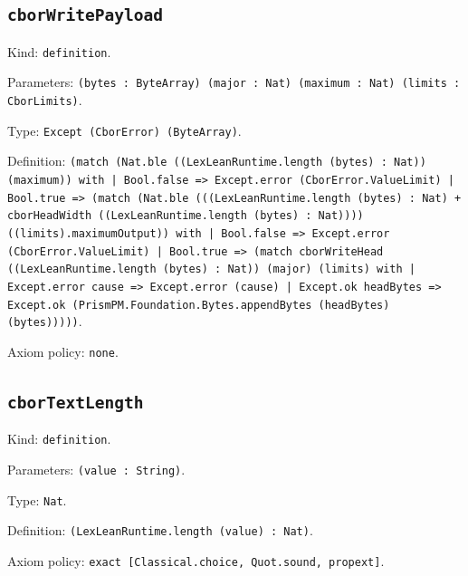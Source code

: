 \documentclass[11pt]{article}
\begin{document}
\subsection*{\texttt{cborWritePayload}}
\noindent Kind: \texttt{definition}.\par
\noindent Parameters: \texttt{(bytes : ByteArray) (major : Nat) (maximum : Nat) (limits : CborLimits)}.\par
\noindent Type: \texttt{Except (CborError) (ByteArray)}.\par
\noindent Definition: \texttt{(match (Nat.ble ((LexLeanRuntime.length (bytes) : Nat)) (maximum)) with | Bool.false => Except.error (CborError.ValueLimit) | Bool.true => (match (Nat.ble (((LexLeanRuntime.length (bytes) : Nat) + cborHeadWidth ((LexLeanRuntime.length (bytes) : Nat)))) ((limits).maximumOutput)) with | Bool.false => Except.error (CborError.ValueLimit) | Bool.true => (match cborWriteHead ((LexLeanRuntime.length (bytes) : Nat)) (major) (limits) with | Except.error cause => Except.error (cause) | Except.ok headBytes => Except.ok (PrismPM.Foundation.Bytes.appendBytes (headBytes) (bytes)))))}.\par
\noindent Axiom policy: \texttt{none}.\par
\subsection*{\texttt{cborTextLength}}
\noindent Kind: \texttt{definition}.\par
\noindent Parameters: \texttt{(value : String)}.\par
\noindent Type: \texttt{Nat}.\par
\noindent Definition: \texttt{(LexLeanRuntime.length (value) : Nat)}.\par
\noindent Axiom policy: \texttt{exact [Classical.choice, Quot.sound, propext]}.\par
\end{document}

